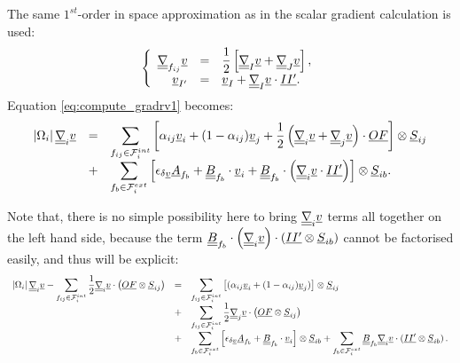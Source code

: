 The same $1^{st}$-order in space approximation as in the scalar gradient calculation is used:
\begin{equation*}
\left\{\begin{array}{r c l}
\underline{\underline{\nabla}}_{{f_{ij}}} \underline{v} & = & \displaystyle \dfrac{1}{2}\left[ \underline{\underline{\nabla}}_{I} \underline{v} + \underline{\underline{\nabla}}_{J} \underline{v} \right],\\
\underline{v}_{{I^\prime}} &= & \underline{v}_{I} + \underline{\underline{\nabla}}_{I} \underline{v} \cdot \underline{I {I^\prime} } .
\end{array}\right .
\end{equation*}
Equation \eqref{eq:compute_gradrv1} becomes:
%
\begin{equation*}
\begin{array}{r c l}
\left| \Omega_{i} \right| \underline{\underline{\nabla}}_{i} \underline{v} &=&
\displaystyle
\sum\limits_{{f_{ij}} \in \mathcal{F}^{int}_{i}}
\left[\alpha_{{ij}} \underline{v}_i
+ (1 - \alpha_{{ij}}) \underline{v}_j  + \frac{1}{2}
\left( \underline{\underline{\nabla}}_i \underline{v} +\underline{\underline{\nabla}}_j \underline{v} \right) \cdot \underline{O F }  \right] \otimes {\underline{S}_{{ij}}}\\
&+& \displaystyle
\sum\limits_{{f_{b}} \in \mathcal{F}^{ext}_{i}}
\left[ \epsilon_{\delta \underline{v}}\underline{A}_{{f_{b}}} +
\underline{\underline{B}}_{{f_{b}}} \cdot \underline{v}_{i} + \underline{\underline{B}}_{{f_{b}}} \cdot \left( \underline{\underline{\nabla}}_{i} \underline{v} \cdot \underline{I {I^\prime}} \right)
\right] \otimes \underline{S}_{{ib}}.
\end{array}
\end{equation*}

Note that, there is no simple possibility here to bring
 $\underline{\underline{\nabla}}_i \underline{v}$ terms all together on the left hand side, because the term
 $ \underline{\underline{B}}_{{f_{b}}} \cdot \left( \underline{\underline{\nabla}}_{i} \underline{v} \right) \cdot \left( \underline{I {I^\prime}}
\otimes \underline{S}_{{ib}} \right)$ cannot be factorised easily, and thus will be explicit:
%
\begin{equation}\label{eq:gradrv_recontruit}
\begin{array}{r c l}
\displaystyle
\left| \Omega_{i} \right| \underline{\underline{\nabla}}_{i} \underline{v} -
\sum\limits_{ {f_{ij}} \in \mathcal{F}^{int}_{i}} \frac{1}{2} \underline{\underline{\nabla}}_i \underline{v} \cdot \left( \underline{O F} \otimes \underline{S}_{{ij}} \right)
&=&
\displaystyle
\sum\limits_{{f_{ij}} \in \mathcal{F}^{int}_{i}}\left[
(\alpha_{{ij}} \underline{v}_i + (1 - \alpha_{{ij}}) \underline{v}_j)\right] \otimes \underline{S}_{{ij}} \\
&+&
\displaystyle
\sum\limits_{{f_{ij}} \in \mathcal{F}^{int}_{i}} \frac{1}{2} \underline{\underline{\nabla}}_j \underline{v} \cdot \left( \underline{O F} \otimes \underline{S}_{{ij}} \right) \\
&+&
\displaystyle
\sum\limits_{{f_{b}} \in \mathcal{F}^{ext}_{i}}\left[ \epsilon_{\delta \underline{v}} \underline{A}_{{f_{b}}} + \underline{\underline{B}}_{{f_{b}}} \cdot \underline{v}_i \right] \otimes \underline{S}_{{ib}}
+
\sum\limits_{ {f_{b}} \in \mathcal{F}^{ext}_{i}} \underline{\underline{B}}_{{f_{b}}} \underline{\underline{\nabla}}_i \underline{v} \cdot \left( \underline{I {I^\prime}}  \otimes \underline{S}_{{ib}} \right)
.
\end{array}
\end{equation}


